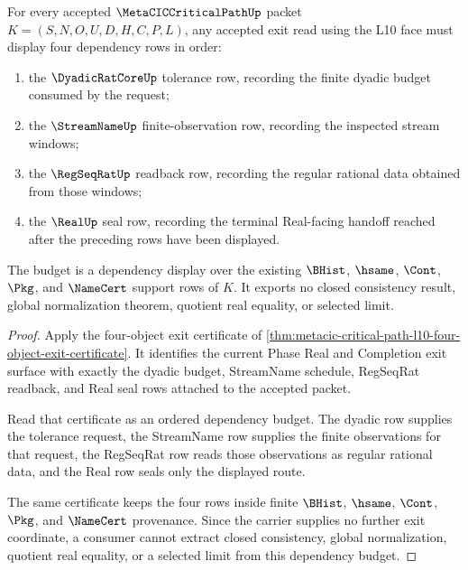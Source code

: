 \begin{theorem}
\label{thm:metaciccriticalpath-l10-exit-dependency-budget}
For every accepted $\MetaCICCriticalPathUp$ packet $K=(S,N,O,U,D,H,C,P,L)$, any accepted exit read using the L10 face must display four dependency rows in order:
\begin{enumerate}
\item the $\DyadicRatCoreUp$ tolerance row, recording the finite dyadic budget consumed by the request;
\item the $\StreamNameUp$ finite-observation row, recording the inspected stream windows;
\item the $\RegSeqRatUp$ readback row, recording the regular rational data obtained from those windows;
\item the $\RealUp$ seal row, recording the terminal Real-facing handoff reached after the preceding rows have been displayed.
\end{enumerate}
The budget is a dependency display over the existing $\BHist$, $\hsame$, $\Cont$, $\Pkg$, and $\NameCert$ support rows of $K$. It exports no closed consistency result, global normalization theorem, quotient real equality, or selected limit.
\end{theorem}
\begin{proof}
Apply the four-object exit certificate of \autoref{thm:metacic-critical-path-l10-four-object-exit-certificate}. It identifies the current Phase Real and Completion exit surface with exactly the dyadic budget, StreamName schedule, RegSeqRat readback, and Real seal rows attached to the accepted packet.

Read that certificate as an ordered dependency budget. The dyadic row supplies the tolerance request, the StreamName row supplies the finite observations for that request, the RegSeqRat row reads those observations as regular rational data, and the Real row seals only the displayed route.

The same certificate keeps the four rows inside finite $\BHist$, $\hsame$, $\Cont$, $\Pkg$, and $\NameCert$ provenance. Since the carrier supplies no further exit coordinate, a consumer cannot extract closed consistency, global normalization, quotient real equality, or a selected limit from this dependency budget.
\end{proof}

